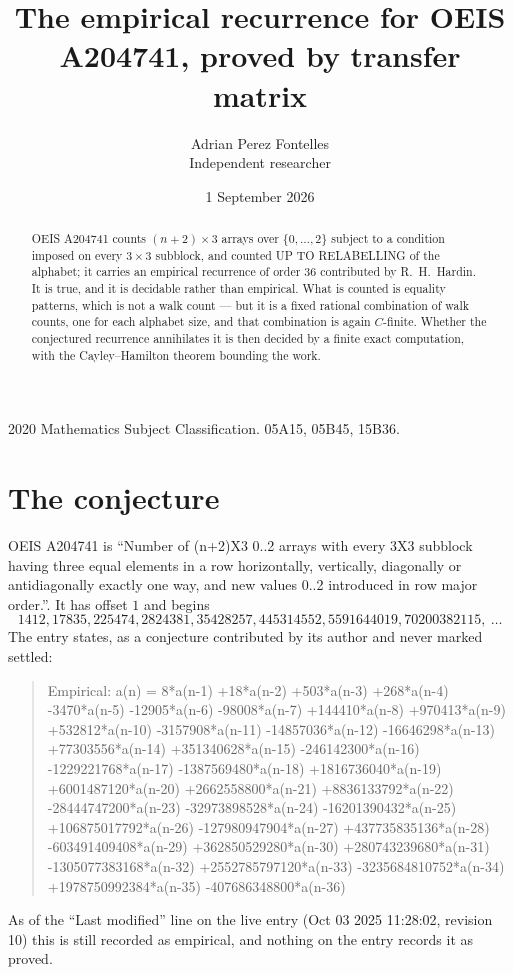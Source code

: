 \documentclass[11pt,a4paper]{article}
\title{The empirical recurrence for OEIS A204741, proved by transfer matrix}
\author{Adrian Perez Fontelles\\ \small Independent researcher}
\date{1 September 2026}
\theoremstyle{plain}
\theoremstyle{definition}
\begin{document}
\maketitle

\begin{abstract}
OEIS A204741 counts $(n+2)\times3$ arrays over $\{0,\dots,2\}$ subject to a condition imposed on
every $3\times3$ subblock, and counted UP TO RELABELLING of the
alphabet; it carries an empirical recurrence of order $36$ contributed by
R.~H.~Hardin. It is true, and it is decidable rather than empirical. What is counted is
equality patterns, which is not a walk count --- but it is a fixed rational combination of
walk counts, one for each alphabet size, and that combination is again $C$-finite. Whether the
conjectured recurrence annihilates it is then decided by a finite exact computation, with the
Cayley--Hamilton theorem bounding the work.
\end{abstract}

\noindent\small 2020 Mathematics Subject Classification. 05A15, 05B45, 15B36.\normalsize

\section{The conjecture}

OEIS A204741 is ``Number of (n+2)X3 0..2 arrays with every 3X3 subblock having three equal elements in a row horizontally, vertically, diagonally or antidiagonally exactly one way, and new values 0..2 introduced in row major order.''. It has offset $1$ and begins
\[
1412, 17835, 225474, 2824381, 35428257, 445314552, 5591644019, 70200382115,\ \dots
\]
The entry states, as a conjecture contributed by its author and never marked settled:
\begin{quote}
Empirical: a(n) = 8*a(n-1) +18*a(n-2) +503*a(n-3) +268*a(n-4) -3470*a(n-5) -12905*a(n-6) -98008*a(n-7) +144410*a(n-8) +970413*a(n-9) +532812*a(n-10) -3157908*a(n-11) -14857036*a(n-12) -16646298*a(n-13) +77303556*a(n-14) +351340628*a(n-15) -246142300*a(n-16) -1229221768*a(n-17) -1387569480*a(n-18) +1816736040*a(n-19) +6001487120*a(n-20) +2662558800*a(n-21) +8836133792*a(n-22) -28444747200*a(n-23) -32973898528*a(n-24) -16201390432*a(n-25) +106875017792*a(n-26) -127980947904*a(n-27) +437735835136*a(n-28) -603491409408*a(n-29) +362850529280*a(n-30) +280743239680*a(n-31) -1305077383168*a(n-32) +2552785797120*a(n-33) -3235684810752*a(n-34) +1978750992384*a(n-35) -407686348800*a(n-36)
\end{quote}
As of the ``Last modified'' line on the live entry (Oct 03 2025 11:28:02, revision 10) this is still
recorded as empirical, and nothing on the entry records it as proved.
\end{document}
